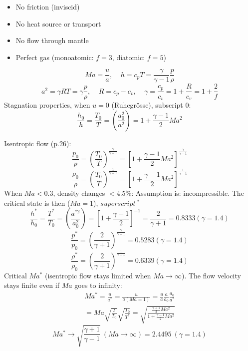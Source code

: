 \documentclass[8pt, landscape, fleqn]{scrartcl}
\begin{document}
\begin{multicols*}{3}
\begin{itemize}
    \item No friction (inviscid)
    \item No heat source or transport
    \item No flow through mantle
    \item Perfect gas (monoatomic: $f=3$, diatomic: $f=5$)
\end{itemize}
\begin{equation*}
    Ma = \frac{u}{a}, ~~~~~ h=c_p T = \frac{\gamma}{\gamma-1} \frac{p}{\rho}
\end{equation*}
\begin{equation*}
    a^2 = \gamma R T = \gamma \frac{p}{\rho}, ~~~~~ R = c_p - c_v, ~~~~~ \gamma = \frac{c_p}{c_v} = 1 + \frac{R}{c_v} = 1 + \frac{2}{f}
\end{equation*}
Stagnation properties, when $u=0$ (Ruhegrösse), subscript 0: 
\begin{equation*}
    \frac{h_0}{h} = \frac{T_0}{T} = \left( \frac{a_0^2}{a^2}\right) = 1 + \frac{\gamma - 1}{2} Ma^2
\end{equation*}

Isentropic flow (p.26):
\begin{equation*}
    \frac{p_0}{p} = \left( \frac{T_0}{T}\right)^{\frac{\gamma}{\gamma -1}} = \left[ 1 + \frac{\gamma-1}{2} Ma^2 \right]^{\frac{\gamma}{\gamma-1}}
\end{equation*}
\begin{equation*}
    \frac{\rho_0}{\rho} = \left( \frac{T_0}{T} \right)^{\frac{1}{\gamma-1}} = \left[ 1 + \frac{\gamma-1}{2} Ma^2 \right]^{\frac{1}{\gamma-1}}
\end{equation*}
When $Ma < 0.3$, density changes $< 4.5 \%$: Assumption is: incompressible. The critical state is then ($Ma = 1$), $superscript~^*$
\begin{equation*}
    \frac{h^*}{h_0} = \frac{T^*}{T_0} = \left( \frac{a^{*2}}{a_0^2}\right) = \left[ 1 + \frac{\gamma -1 }{2}\right]^{-1} = \frac{2}{\gamma+1} = 0.8333 (\gamma = 1.4)
\end{equation*}
\begin{equation*}
    \frac{p^*}{p_0} = \left( \frac{2}{\gamma+1} \right)^{\frac{\gamma}{\gamma-1}} = 0.5283 (\gamma = 1.4)
\end{equation*}
\begin{equation*}
    \frac{\rho^*}{\rho_0} = \left( \frac{2}{\gamma+1} \right)^{\frac{1}{\gamma-1}} = 0.6339 (\gamma = 1.4)
\end{equation*}
Critical $Ma^*$ (isentropic flow stays limited when $Ma \rightarrow \infty$). The flow velocity stays finite even if $Ma$ goes to infinity:
\begin{align*}
    Ma^* = \frac{u}{a^*} = \frac{u}{a(Ma=1)} = \frac{u}{a}\frac{a}{a_0}\frac{a_0}{a^*} \\
    = Ma \sqrt{\frac{T}{T_0}}\sqrt{\frac{T_0}{T^*}} = \sqrt{\frac{\frac{\gamma+1}{2}Ma^2}{1+\frac{\gamma-1}{2}Ma^2}}
\end{align*}
\begin{equation*}
    Ma^* \rightarrow \sqrt{\frac{\gamma+1}{\gamma-1}}~(Ma \rightarrow \infty) = 2.4495~(\gamma = 1.4)
\end{equation*}


\end{multicols*}
\end{document}
